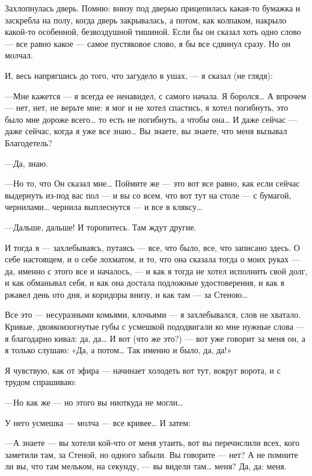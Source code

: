 \documentclass[11pt,openany]{book}
\begin{document}
Захлопнулась дверь. Помню: внизу под дверью прицепилась какая-то бумажка и заскребла на полу, когда дверь закрывалась, а потом, как колпаком, накрыло какой-то особенной, безвоздушной тишиной. Если бы он сказал хоть одно слово --- все равно какое --- самое пустяковое слово, я бы все сдвинул сразу. Но он молчал.

И, весь напрягшись до того, что загудело в ушах, --- я сказал (не глядя):

---Мне кажется --- я всегда ее ненавидел, с самого начала. Я боролся\ldots{} А впрочем --- нет, нет, не верьте мне: я мог и не хотел спастись, я хотел погибнуть, это было мне дороже всего\ldots{} то есть не погибнуть, а чтобы она\ldots{} И даже сейчас --- даже сейчас, когда я уже все знаю\ldots{} Вы знаете, вы знаете, что меня вызывал Благодетель?

---Да, знаю.

---Но то, что Он сказал мне\ldots{} Поймите же --- это вот все равно, как если сейчас выдернуть из-под вас пол --- и вы со всем, что вот тут на столе --- с бумагой, чернилами\ldots{} чернила выплеснутся --- и все в кляксу\ldots{}

---Дальше, дальше! И торопитесь. Там ждут другие.

И тогда я --- захлебываясь, путаясь --- все, что было, все, что записано здесь. О себе настоящем, и о себе лохматом, и то, что она сказала тогда о моих руках --- да, именно с этого все и началось, --- и как я тогда не хотел исполнить свой долг, и как обманывал себя, и как она достала подложные удостоверения, и как я ржавел день ото дня, и коридоры внизу, и как там --- за Стеною\ldots{}

Все это --- несуразными комьями, клочьями --- я захлебывался, слов не хватало. Кривые, двоякоизогнутые губы с усмешкой пододвигали ко мне нужные слова --- я благодарно кивал: да, да\ldots{} И вот (что же это?) --- вот уже говорит за меня он, а я только слушаю: «Да, а потом\ldots{} Так именно и было, да, да!»

Я чувствую, как от эфира --- начинает холодеть вот тут, вокруг ворота, и с трудом спрашиваю:

---Но как же --- но этого вы ниоткуда не могли\ldots{}

У него усмешка --- молча --- все кривее\ldots{} И затем:

---А знаете --- вы хотели кой-что от меня утаить, вот вы перечислили всех, кого заметили там, за Стеной, но одного забыли. Вы говорите --- нет? А не помните ли вы, что там мельком, на секунду, --- вы видели там\ldots{} меня? Да, да: меня.
\end{document}
